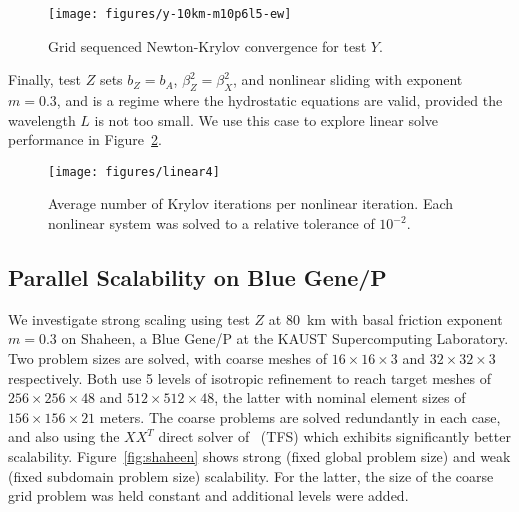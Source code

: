 \documentclass[3p]{elsarticle}
\begin{document}
\begin{figure}
  \centering\caption{Grid sequenced Newton-Krylov convergence for test $Y$.}\label{fig:testy}
  \texttt{[image: figures/y-10km-m10p6l5-ew]}
\end{figure}

Finally, test $Z$ sets $b_Z = b_A$, $\beta_Z^2 = \beta_X^2$, and nonlinear sliding with exponent $m=0.3$, and is a regime where the hydrostatic equations are valid, provided the wavelength $L$ is not too small.  We use this case to explore linear solve performance in Figure~\ref{fig:linear}.

\begin{figure}
  \centering\caption{Average number of Krylov iterations per nonlinear iteration.  Each nonlinear system was solved to a relative tolerance of $10^{-2}$.}\label{fig:linear}
  \texttt{[image: figures/linear4]}
\end{figure}

\subsection{Parallel Scalability on Blue Gene/P}\label{sec:pscaling}
We investigate strong scaling using test $Z$ at \SI{80}{\kilo\metre} with basal friction exponent $m= 0.3$ on Shaheen, a Blue Gene/P at the KAUST Supercomputing Laboratory.  Two problem sizes are solved, with coarse meshes of $16\times 16\times 3$ and $32\times 32\times 3$ respectively.  Both use 5 levels of isotropic refinement to reach target meshes of $256\times 256\times 48$ and $512\times 512\times 48$, the latter with nominal element sizes of $156\times 156\times 21$ meters.  The coarse problems are solved redundantly in each case, and also using the $XX^T$ direct solver of~\cite{tufo2001fast} (TFS) which exhibits significantly better scalability.  Figure~\ref{fig:shaheen} shows strong (fixed global problem size) and weak (fixed subdomain problem size) scalability. For the latter, the size of the coarse grid problem was held constant and additional levels were added.
\end{document}
